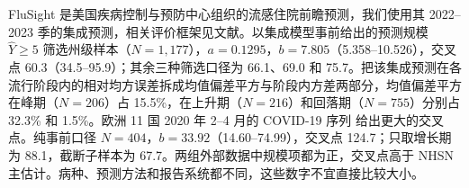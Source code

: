 FluSight 是美国疾病控制与预防中心组织的流感住院前瞻预测，我们使用其 2022--2023 季的集成预测\citep{mathis2024evaluation}，相关评价框架见文献\citep{reich2019accuracy, cramer2022evaluation}。以集成模型事前给出的预测规模 $\widehat Y\geq5$ 筛选州级样本（$N=1{,}177$），$a=0.1295$，$b=7.805$（5.358--10.526），交叉点 60.3（34.5--95.9）；其余三种筛选口径为 66.1、69.0 和 75.7。把该集成预测在各流行阶段内的相对均方误差拆成均值偏差平方与阶段内方差两部分，均值偏差平方在峰期（$N=206$）占 15.5\%，在上升期（$N=216$）和回落期（$N=755$）分别占 32.3\% 和 1.5\%。欧洲 11 国 2020 年 2--4 月的 COVID-19 序列\citep{flaxman2020estimating} 给出更大的交叉点。纯事前口径 $N=404$，$b=33.92$（14.60--74.99），交叉点 124.7；只取增长期为 88.1，截断子样本为 67.7。两组外部数据中规模项都为正，交叉点高于 NHSN 主估计。病种、预测方法和报告系统都不同，这些数字不宜直接比较大小。
